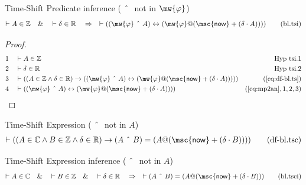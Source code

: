 \begin{lemma} Time-Shift Predicate inference ($~\string^~$
not in $\mw{\varphi}$)
\begin{align}
\vdash A \in \mathbb{Z}\quad\&\quad \vdash \delta \in
    \mathbb{R}\quad\Rightarrow\quad \vdash ( ( \mw{\varphi} ~\string^~ A )
    \leftrightarrow ( \mw{\varphi} @ ( \mathsf{\msc{now}} + ( \delta \cdot A )
    ) ) )\label{eq:bl.tsi}\tag{bl.tsi}
\end{align}
\end{lemma}

\begin{proof}
\begin{align}
  1 &&  & \vdash A \in \mathbb{Z}&\text{Hyp~tsi.1}\notag%
  \\ 2 &&  & \vdash \delta \in \mathbb{R}&\text{Hyp~tsi.2}\notag%
  \\ 3 &&  & \vdash ( ( A \in \mathbb{Z} \wedge \delta \in \mathbb{R} ) \rightarrow ( ( \mw{\varphi} ~\string^~ A ) \leftrightarrow ( \mw{\varphi} @ ( \mathsf{\msc{now}} + ( \delta \cdot A ) ) ) ) )&(\mbox{\ref{eq:df-bl.ts}})\notag
  \\ 4 &&  & \vdash ( ( \mw{\varphi} ~\string^~ A ) \leftrightarrow ( \mw{\varphi} @ ( \mathsf{\msc{now}} + ( \delta \cdot A ) ) ) )&(\mbox{\ref{eq:mp2an}},1,2,3)\notag
\end{align}
\end{proof}

\begin{metadefinition} Time-Shift Expression ($~\string^~$
not in $A$)
\begin{align}
\vdash ( ( A \in \mathbb{C} \wedge B \in \mathbb{Z} \wedge \delta \in
    \mathbb{R} ) \rightarrow ( A ~\string^~ B ) = ( A @ ( \mathsf{\msc{now}} +
    ( \delta \cdot B ) ) ) )\label{eq:df-bl.tsc}\tag{df-bl.tsc}
\end{align}
\end{metadefinition}

\begin{lemma} Time-Shift Expression inference
($~\string^~$ not in $A$)
\begin{align}
\vdash A \in \mathbb{C}\quad\&\quad \vdash B \in \mathbb{Z}\quad\&\quad \vdash
    \delta \in \mathbb{R}\quad\Rightarrow\quad \vdash ( A ~\string^~ B ) = ( A
    @ ( \mathsf{\msc{now}} + ( \delta \cdot B ) )
    )\label{eq:bl.tsci}\tag{bl.tsci}
\end{align}
\end{lemma}

